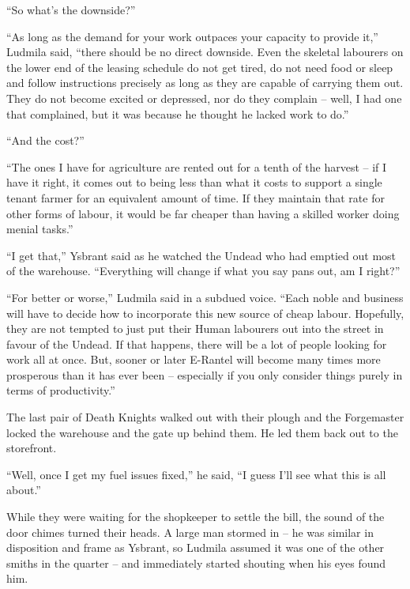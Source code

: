  

“So what’s the downside?”

 

“As long as the demand for your work outpaces your capacity to provide it,” Ludmila said, “there should be no direct downside. Even the skeletal labourers on the lower end of the leasing schedule do not get tired, do not need food or sleep and follow instructions precisely as long as they are capable of carrying them out. They do not become excited or depressed, nor do they complain – well, I had one that complained, but it was because he thought he lacked work to do.”

 

“And the cost?”

 

“The ones I have for agriculture are rented out for a tenth of the harvest – if I have it right, it comes out to being less than what it costs to support a single tenant farmer for an equivalent amount of time. If they maintain that rate for other forms of labour, it would be far cheaper than having a skilled worker doing menial tasks.”

 

“I get that,” Ysbrant said as he watched the Undead who had emptied out most of the warehouse. “Everything will change if what you say pans out, am I right?”

 

“For better or worse,” Ludmila said in a subdued voice. “Each noble and business will have to decide how to incorporate this new source of cheap labour. Hopefully, they are not tempted to just put their Human labourers out into the street in favour of the Undead. If that happens, there will be a lot of people looking for work all at once. But, sooner or later E-Rantel will become many times more prosperous than it has ever been – especially if you only consider things purely in terms of productivity.”

 

The last pair of Death Knights walked out with their plough and the Forgemaster locked the warehouse and the gate up behind them. He led them back out to the storefront.

 

“Well, once I get my fuel issues fixed,” he said, “I guess I’ll see what this is all about.”

 

While they were waiting for the shopkeeper to settle the bill, the sound of the door chimes turned their heads. A large man stormed in – he was similar in disposition and frame as Ysbrant, so Ludmila assumed it was one of the other smiths in the quarter – and immediately started shouting when his eyes found him.

